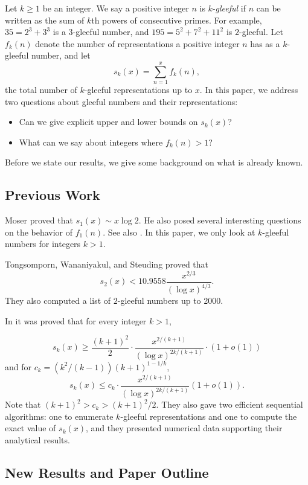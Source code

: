 \documentclass[11pt]{amsart}
\newcommand{\sk}{s_k}
\numberwithin{equation}{section}
\numberwithin{algorithm}{section}
\begin{document}
Let $k\ge1$ be an integer.
We say a positive integer $n$ is $k$-\textit{gleeful} if $n$
  can be written as the sum of $k$th powers of consecutive
  primes.
For example, $35=2^3+3^3$ is a $3$-gleeful number,
  and $195=5^2+7^2+11^2$ is $2$-gleeful.
Let $f_k(n)$ denote the number of representations a positive
  integer $n$ has as a $k$-gleeful number,
  and let 
  $$ \sk(x) = \sum_{n=1}^x f_k(n),$$
  the total number of $k$-gleeful representations up to $x$.
In this paper, we address two questions about gleeful numbers
  and their representations:
  \begin{itemize}
      \item Can we give explicit upper and lower bounds on
      $\sk(x)$?
      \item What can we say about integers where $f_k(n)>1$?
  \end{itemize}
Before we state our results, we give some background on
  what is already known.

\subsection{Previous Work}

Moser \cite{Moser63} proved that $s_1(x) \sim x\log 2$.
He also posed several interesting questions on the behavior
  of $f_1(n)$.
See also \cite{UPINT}.
In this paper, we only look at $k$-gleeful numbers for integers $k>1$.

Tongsomporn, Wananiyakul, and Steuding \cite{TWS2022}
  proved that 
  $$s_2(x) < 10.9558 \frac{x^{2/3}}{(\log x)^{4/3}}.$$
They also computed a list of $2$-gleeful numbers up to 2000.

In \cite{OSS2024} it was proved that for every integer $k>1$,

\begin{equation}\label{eq:sopplower}
s_k(x) \ge \frac{(k+1)^2}{2} \cdot
 \frac{x^{2/(k+1)}}{(\log x)^{{2k/(k+1)}}}\cdot(1+o(1))
\end{equation} 
and for $c_k= (k^2/(k-1)) (k+1)^{1-1/k}$,
\begin{equation}\label{eq:soppupper}
s_k(x) \le c_k \cdot
\frac{x^{2/(k+1)}}{(\log x)^{{2k/(k+1)}}}(1+o(1)).
\end{equation}
Note that $(k+1)^2>c_k>(k+1)^2/2$.
They also gave two efficient sequential algorithms:
  one to enumerate $k$-gleeful representations
  and one to compute the exact value of $s_k(x)$,
  and they presented numerical data supporting their analytical results.

\subsection{New Results and Paper Outline}
\end{document}
